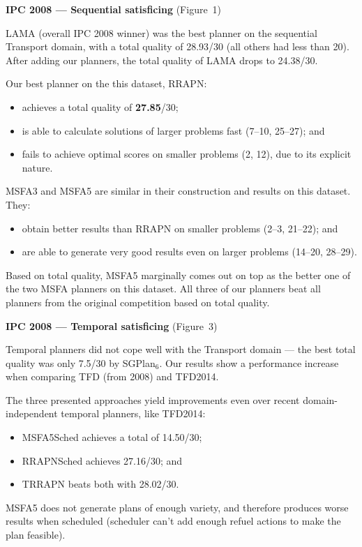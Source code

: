 \documentclass[a0paper,fontscale=0.285]{baposter} %
\begin{document}
\begin{poster}
{\begin{multicols}{3}
\textbf{IPC 2008 --- Sequential satisficing} (Figure~1)
\vspace{0.15cm}

LAMA (overall IPC 2008 winner)
was the best planner on the sequential Transport domain, 
with a total quality of 28.93/30 (all others had less than 20).
After adding our planners, the total quality of LAMA drops to 24.38/30.

Our best planner on the this dataset, RRAPN:
\begin{itemize}
\item achieves a total quality of \textbf{27.85}/30;
\item is able to calculate
solutions of larger problems fast (7--10, 25--27); and
\item fails to achieve optimal scores
on smaller problems (2, 12),
due to its explicit nature.
\end{itemize}
MSFA3 and MSFA5 are similar in their construction and results on this dataset. They:
\begin{itemize}
\item obtain better results than RRAPN on smaller problems
(2--3, 21--22); and
\item are able to generate very good results even on larger problems (14--20, 28--29).
\end{itemize}
Based on total quality, MSFA5 marginally comes out on top as the better one of the two MSFA planners on this dataset.
All three of our planners beat all planners from the original competition based on total quality.

\vspace{0.15cm}
\textbf{IPC 2008 --- Temporal satisficing} (Figure~3)
\vspace{0.15cm}

Temporal planners did not cope well with the Transport domain
--- the best total quality was only 7.5/30 by SGPlan$_6$.
Our results show a performance increase when comparing TFD (from 2008) and TFD2014.

The three presented approaches yield improvements even over recent domain-independent temporal planners, like TFD2014:
\begin{itemize}
\item MSFA5Sched achieves a total of 14.50/30;
\item RRAPNSched achieves 27.16/30; and
\item TRRAPN beats both with 28.02/30.
\end{itemize}
MSFA5 does not generate plans of enough variety,
and therefore produces worse results when scheduled
(scheduler can't add enough refuel actions to make the plan feasible).


\end{multicols}}
\end{poster}
\end{document}
